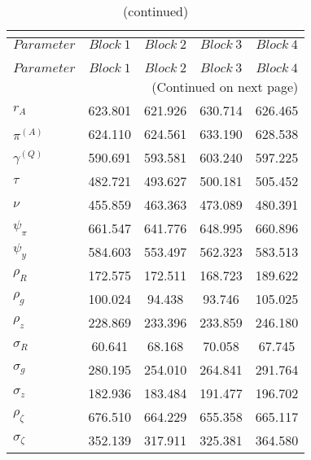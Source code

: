  
\begin{center}
\begin{longtable}{lcccc} 
\caption{MCMC Inefficiency factors per block}\\
 \label{Table:MCMC_inefficiency_factors}\\
\toprule 
$Parameter         $	 & 	 $     Block~1$	 & 	 $     Block~2$	 & 	 $     Block~3$	 & 	 $     Block~4$\\
\midrule \endfirsthead 
\caption{(continued)}\\
 \toprule \\ 
$Parameter         $	 & 	 $     Block~1$	 & 	 $     Block~2$	 & 	 $     Block~3$	 & 	 $     Block~4$\\
\midrule \endhead 
\midrule \multicolumn{5}{r}{(Continued on next page)} \\ \bottomrule \endfoot 
\bottomrule \endlastfoot 
$ {r_{A}}          $	 & 	     623.801	 & 	     621.926	 & 	     630.714	 & 	     626.465 \\ 
$ {\pi^{(A)}}      $	 & 	     624.110	 & 	     624.561	 & 	     633.190	 & 	     628.538 \\ 
$ {\gamma^{(Q)}}   $	 & 	     590.691	 & 	     593.581	 & 	     603.240	 & 	     597.225 \\ 
$ {\tau}           $	 & 	     482.721	 & 	     493.627	 & 	     500.181	 & 	     505.452 \\ 
$ {\nu}            $	 & 	     455.859	 & 	     463.363	 & 	     473.089	 & 	     480.391 \\ 
$ {\psi_\pi}       $	 & 	     661.547	 & 	     641.776	 & 	     648.995	 & 	     660.896 \\ 
$ {\psi_y}         $	 & 	     584.603	 & 	     553.497	 & 	     562.323	 & 	     583.513 \\ 
$ {\rho_R}         $	 & 	     172.575	 & 	     172.511	 & 	     168.723	 & 	     189.622 \\ 
$ {\rho_{g}}       $	 & 	     100.024	 & 	      94.438	 & 	      93.746	 & 	     105.025 \\ 
$ {\rho_z}         $	 & 	     228.869	 & 	     233.396	 & 	     233.859	 & 	     246.180 \\ 
$ {\sigma_R}       $	 & 	      60.641	 & 	      68.168	 & 	      70.058	 & 	      67.745 \\ 
$ {\sigma_{g}}     $	 & 	     280.195	 & 	     254.010	 & 	     264.841	 & 	     291.764 \\ 
$ {\sigma_z}       $	 & 	     182.936	 & 	     183.484	 & 	     191.477	 & 	     196.702 \\ 
$ {\rho_\zeta}     $	 & 	     676.510	 & 	     664.229	 & 	     655.358	 & 	     665.117 \\ 
$ {\sigma_\zeta}   $	 & 	     352.139	 & 	     317.911	 & 	     325.381	 & 	     364.580 \\ 
\end{longtable}
 \end{center}
